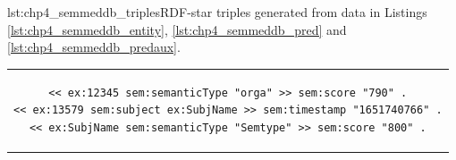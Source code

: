 \noindent\hspace{0.04\linewidth}\begin{minipage}{\linewidth}
\begin{captionedlisting}{lst:chp4_semmeddb_triples}{RDF-star triples generated from data in Listings \ref{lst:chp4_semmeddb_entity}, \ref{lst:chp4_semmeddb_pred} and \ref{lst:chp4_semmeddb_predaux}.}
\centering
\begin{tabular}{c}
\hspace{1em}
{
\begin{lstlisting}[basicstyle=\ttfamily\small,label={list:example1},columns=flexible]
<< ex:12345 sem:semanticType "orga" >> sem:score "790" .
<< ex:13579 sem:subject ex:SubjName >> sem:timestamp "1651740766" .
<< ex:SubjName sem:semanticType "Semtype" >> sem:score "800" .
\end{lstlisting}
}
\end{tabular}
\end{captionedlisting}
\end{minipage}




